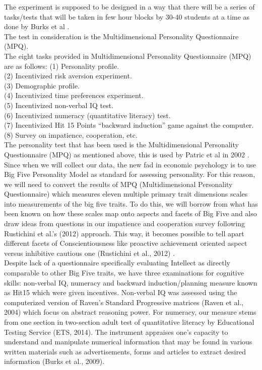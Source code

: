\documentclass[12pt,a4paper]{article}
\begin{document}
{The experiment is supposed to be designed in a way that there will be a series of tasks/tests that will be taken in few hour blocks by 30-40 students at a time as done by Burks et al \cite{BURKS}.\\
The test in consideration is the Multidimensional Personality Questionnaire (MPQ).\\
The eight tasks provided in Multidimensional Personality Questionnaire (MPQ) are as follows:
(1) Personality profile.\\
(2) Incentivized risk aversion experiment.\\
(3) Demographic profile.\\
(4) Incentivized time preferences experiment.\\
(5) Incentivized non-verbal IQ test.\\
(6) Incentivized numeracy (quantitative literacy) test.\\
(7) Incentivized Hit 15 Points “backward induction” game against the computer.\\
(8) Survey on impatience, cooperation, etc.\\
The personality test that has been used is the Multidimensional Personality Questionnaire (MPQ) as mentioned above, this is used by Patric et al in 2002 \cite{patrick}. 
Since when we will collect our data, the new fad in economic psychology is to use Big Five Personality Model as standard for assessing personality. For this reason, we will need to convert the results of MPQ (Multidimensional Personality Questionnaire) which measures eleven multiple primary trait dimensions scales into measurements of the big five traits. To do this, we will borrow from what has been known on how these scales map onto aspects and facets of Big Five and also draw ideas from questions in our impatience and cooperation survey following Rustichini et al.’s (2012) approach. This way, it becomes possible to tell apart different facets of Conscientiousness like proactive achievement oriented aspect versus inhibitive cautious one (Rustichini et al., 2012) \cite{rustichini2016toward}.\\
Despite lack of a questionnaire specifically evaluating Intellect as directly comparable to other Big Five traits, we have three examinations for cognitive skills: non-verbal IQ, numeracy and backward induction/planning measure known as Hit15 which were given incentives. Non-verbal IQ was assessed using the computerized version of Raven’s Standard Progressive matrices (Raven et al., 2004)\cite{raven1998raven} which focus on abstract reasoning power. For numeracy, our measure stems from one section in two-section adult test of quantitative literacy by Educational Testing Service (ETS, 2014). The instrument appraises one's capacity to understand and manipulate numerical information that may be found in various written materials such as advertisements, forms and articles to extract desired information (Burks et al., 2009)\cite{burks2009cognitive}.\\
}
\end{document}
